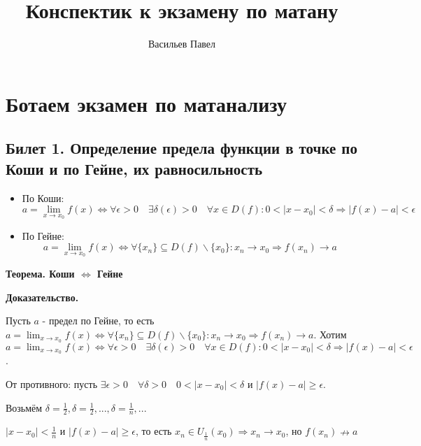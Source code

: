 \documentclass[a4paper]{article}
\title{Конспектик к экзамену по матану}
\author{Васильев Павел}
\begin{document}
\section*{Ботаем экзамен по матанализу}

\subsection*{Билет 1. Определение предела функции в точке по Коши и по Гейне, их равносильность}

\begin{itemize}
\item По Коши: 
	\begin{equation}
		\displaystyle a = \lim_{x \rightarrow x_0} f(x) \Leftrightarrow \forall \epsilon > 0 \quad \exists \delta ( \epsilon) > 0 \quad \forall x \in D(f): 0<|x-x_0|< \delta \Rightarrow |f(x) - a| < \epsilon
	\end{equation}
	
\item По Гейне:
	\begin{equation}
		\displaystyle a = \lim_{x \rightarrow x_0} f(x) \Leftrightarrow \forall \{ x_n \} \subseteq D(f) \backslash{} \{ x_0 \}: x_n \rightarrow x_0 \Rightarrow f(x_n) \rightarrow a
	\end{equation}
\end{itemize}

\begin{htheorem}
\textbf{Теорема. Коши $\Leftrightarrow$ Гейне}
\end{htheorem}

\begin{hproof}
\textbf{Доказательство.}

Пусть $a$ - предел по Гейне, то есть $\displaystyle a = \lim_{x \rightarrow x_0} f(x) \Leftrightarrow \forall \{ x_n \} \subseteq D(f) \backslash{} \{ x_0 \}: x_n \rightarrow x_0 \Rightarrow f(x_n) \rightarrow a$. Хотим $\displaystyle a = \lim_{x \rightarrow x_0} f(x) \Leftrightarrow \forall \epsilon > 0 \quad \exists \delta ( \epsilon) > 0 \quad \forall x \in D(f): 0<|x-x_0|< \delta \Rightarrow |f(x) - a| < \epsilon$.

От противного: пусть $\exists \epsilon > 0 \quad \forall \delta > 0 \quad 0 < |x-x_0| < \delta$ и $|f(x) - a| \geq \epsilon$.

Возьмём $\displaystyle \delta = \frac{1}{2}, \delta = \frac{1}{2}, ..., \delta = \frac{1}{n}, ...$

$\displaystyle |x-x_0| < \frac{1}{n}$ и $|f(x)-a| \geq \epsilon$, то есть $x_n \in U_{\frac{1}{n}}(x_0) \Rightarrow x_n \rightarrow x_0$, но $f(x_n) \nrightarrow a$
\end{hproof}
\end{document}
